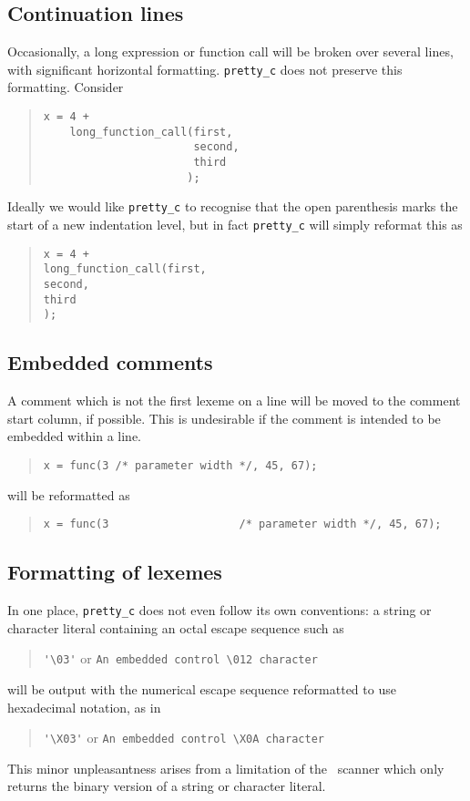 \subsection{Continuation lines}
Occasionally, a long expression or function call will be broken over several lines, with
significant horizontal formatting. \verb+pretty_c+ does not preserve this formatting.
Consider
\begin{quote}
\small
\begin{verbatim}
x = 4 +
    long_function_call(first,
                       second,
                       third
                      );
\end{verbatim}
\end{quote}
Ideally we would like \verb+pretty_c+ to recognise that the open parenthesis marks the 
start of a new indentation level, but in fact \verb+pretty_c+ will simply reformat this as
\begin{quote}
\small
\begin{verbatim}
x = 4 +
long_function_call(first,
second,
third
);
\end{verbatim}
\end{quote}
\subsection{Embedded comments}
A comment which is not the first lexeme on a line will be moved to the comment start column,
if possible. This is undesirable if the comment is intended to be embedded within a line.
\begin{quote}
\small
\begin{verbatim}
x = func(3 /* parameter width */, 45, 67);
\end{verbatim}
\end{quote}
will be reformatted as
\begin{quote}
\small
\begin{verbatim}
x = func(3                    /* parameter width */, 45, 67);
\end{verbatim}
\end{quote}

\subsection{Formatting of lexemes}
\label{bad:string}
In one place, \verb+pretty_c+ does not even follow its own conventions:
a string or character literal containing an octal escape sequence such
as  
\begin{quote}
\verb+'\03'+ or \verb"An embedded control \012 character"
\end{quote}
will be output with the numerical escape sequence reformatted to use hexadecimal
notation, as in
\begin{quote}
\verb+'\X03'+ or \verb"An embedded control \X0A character"
\end{quote}
This minor unpleasantness arises from a limitation of the \rdp\ scanner which only returns
the binary version of a string or character literal.

